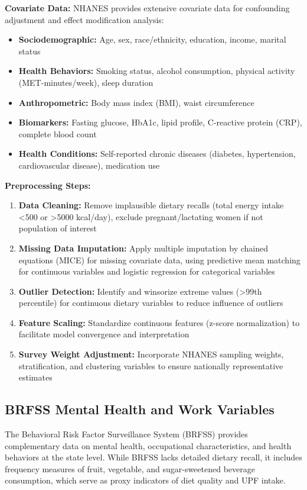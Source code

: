 \documentclass[journal,twoside,10pt]{IEEEtran}
\begin{document}
\textbf{Covariate Data:}
NHANES provides extensive covariate data for confounding adjustment and effect modification analysis:
\begin{itemize}
\item \textbf{Sociodemographic:} Age, sex, race/ethnicity, education, income, marital status
\item \textbf{Health Behaviors:} Smoking status, alcohol consumption, physical activity (MET-minutes/week), sleep duration
\item \textbf{Anthropometric:} Body mass index (BMI), waist circumference
\item \textbf{Biomarkers:} Fasting glucose, HbA1c, lipid profile, C-reactive protein (CRP), complete blood count
\item \textbf{Health Conditions:} Self-reported chronic diseases (diabetes, hypertension, cardiovascular disease), medication use
\end{itemize}

\textbf{Preprocessing Steps:}
\begin{enumerate}
\item \textbf{Data Cleaning:} Remove implausible dietary recalls (total energy intake <500 or >5000 kcal/day), exclude pregnant/lactating women if not population of interest
\item \textbf{Missing Data Imputation:} Apply multiple imputation by chained equations (MICE) for missing covariate data, using predictive mean matching for continuous variables and logistic regression for categorical variables
\item \textbf{Outlier Detection:} Identify and winsorize extreme values (>99th percentile) for continuous dietary variables to reduce influence of outliers
\item \textbf{Feature Scaling:} Standardize continuous features (z-score normalization) to facilitate model convergence and interpretation
\item \textbf{Survey Weight Adjustment:} Incorporate NHANES sampling weights, stratification, and clustering variables to ensure nationally representative estimates
\end{enumerate}

\subsection{BRFSS Mental Health and Work Variables}

The Behavioral Risk Factor Surveillance System (BRFSS) provides complementary data on mental health, occupational characteristics, and health behaviors at the state level. While BRFSS lacks detailed dietary recall, it includes frequency measures of fruit, vegetable, and sugar-sweetened beverage consumption, which serve as proxy indicators of diet quality and UPF intake.
\end{document}

